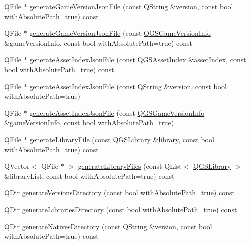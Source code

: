 \begin{DoxyCompactItemize}
Q\+File $\ast$ \mbox{\hyperlink{class_q_g_s_game_directory_af8ac6ae63f8eceec971be1e82e334069}{generate\+Game\+Version\+Json\+File}} (const Q\+String \&version, const bool with\+Absolute\+Path=true) const
\item 
Q\+File $\ast$ \mbox{\hyperlink{class_q_g_s_game_directory_a6b933e58efa7ccdb1d84e88aa71ec6d1}{generate\+Game\+Version\+Json\+File}} (const \mbox{\hyperlink{class_q_g_s_game_version_info}{Q\+G\+S\+Game\+Version\+Info}} \&game\+Version\+Info, const bool with\+Absolute\+Path=true) const
\item 
Q\+File $\ast$ \mbox{\hyperlink{class_q_g_s_game_directory_abda3cdbf34c8c6649aa85d05ee3e83d2}{generate\+Asset\+Index\+Json\+File}} (const \mbox{\hyperlink{class_q_g_s_asset_index}{Q\+G\+S\+Asset\+Index}} \&asset\+Index, const bool with\+Absolute\+Path=true) const
\item 
Q\+File $\ast$ \mbox{\hyperlink{class_q_g_s_game_directory_a36f7eea8dc5af96fea4324a0e74c8a22}{generate\+Asset\+Index\+Json\+File}} (const Q\+String \&version, const bool with\+Absolute\+Path=true)
\item 
Q\+File $\ast$ \mbox{\hyperlink{class_q_g_s_game_directory_a49e127e536b8d473578c8efcc97962e1}{generate\+Asset\+Index\+Json\+File}} (const \mbox{\hyperlink{class_q_g_s_game_version_info}{Q\+G\+S\+Game\+Version\+Info}} \&game\+Version\+Info, const bool with\+Absolute\+Path=true)
\item 
Q\+File $\ast$ \mbox{\hyperlink{class_q_g_s_game_directory_a6c65c56ff8dd9dddcb5fe554d8a102e6}{generate\+Library\+File}} (const \mbox{\hyperlink{class_q_g_s_library}{Q\+G\+S\+Library}} \&library, const bool with\+Absolute\+Path=true) const
\item 
Q\+Vector$<$ Q\+File $\ast$ $>$ \mbox{\hyperlink{class_q_g_s_game_directory_a1a77693d4bca0b8f0d6abe164a96eafb}{generate\+Library\+Files}} (const Q\+List$<$ \mbox{\hyperlink{class_q_g_s_library}{Q\+G\+S\+Library}} $>$ \&library\+List, const bool with\+Absolute\+Path=true) const
\item 
Q\+Dir \mbox{\hyperlink{class_q_g_s_game_directory_a034a40c287c1bb2b3ec6ecc42e97b59b}{generate\+Versions\+Directory}} (const bool with\+Absolute\+Path=true) const
\item 
Q\+Dir \mbox{\hyperlink{class_q_g_s_game_directory_a765b55b6e1d5359d2290c801a815efee}{generate\+Libraries\+Directory}} (const bool with\+Absolute\+Path=true) const
\item 
Q\+Dir \mbox{\hyperlink{class_q_g_s_game_directory_a9350d525196a7c6f59c225f3b5703765}{generate\+Natives\+Directory}} (const Q\+String \&version, const bool with\+Absolute\+Path=true) const

\end{DoxyCompactItemize}
